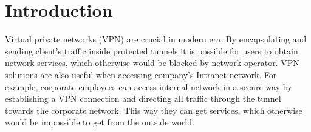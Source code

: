 \section{Introduction}
\label{section:introduction}

Virtual private networks (VPN) are crucial in modern era.
By encapsulating and sending client's traffic inside protected
tunnels it is possible for users to obtain network services,
which otherwise would be blocked by network operator.
VPN solutions are also useful when accessing company’s Intranet
network. For example, corporate employees can access internal
network in a secure way by establishing a VPN connection and
directing all traffic through the tunnel towards the corporate
network. This way they can get services, which otherwise
would be impossible to get from the outside world.